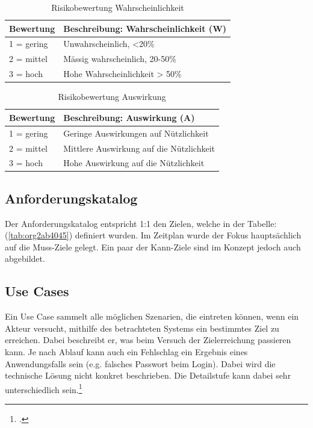 \begin{table}
\centering
\begin{tabular}{l|l}
\textbf{Bewertung} & \textbf{Beschreibung: Wahrscheinlichkeit (W)}\\
\hline
1 = gering & Unwahrscheinlich, <20\%\\
2 = mittel & Mässig wahrscheinlich, 20-50\%\\
3 = hoch & Hohe Wahrscheinlichkeit > 50\%\\
\end{tabular}
\caption{\label{tab:orgc24b878}
Risikobewertung Wahrscheinlichkeit}

\end{table}
\begin{table}
\centering
\begin{tabular}{l|l}
\textbf{Bewertung} & \textbf{Beschreibung: Auswirkung (A)}\\
\hline
1 = gering & Geringe Auswirkungen auf Nützlichkeit\\
2 = mittel & Mittlere Auswirkung auf die Nützlichkeit\\
3 = hoch & Hohe Auswirkung auf die Nützlichkeit\\
\end{tabular}
\caption{\label{tab:org8a27a35}
Risikobewertung Auswirkung}

\end{table}

\subsection{Anforderungskatalog}
\label{sec:org90be6e5}

Der Anforderungskatalog entspricht 1:1 den Zielen, welche in der
Tabelle:(\ref{tab:org2ab4045}) definiert wurden. Im Zeitplan wurde der Fokus
hauptsächlich auf die Muss-Ziele gelegt. Ein paar der Kann-Ziele sind im
Konzept jedoch auch abgebildet.

\subsection{Use Cases}
\label{sec:orgfd94eff}

Ein Use Case sammelt alle möglichen Szenarien, die eintreten können,
wenn ein Akteur versucht, mithilfe des betrachteten Systems ein
bestimmtes Ziel zu erreichen. Dabei beschreibt er, was beim Versuch der
Zielerreichung passieren kann. Je nach Ablauf kann auch ein Fehlschlag
ein Ergebnis eines Anwendungsfalls sein (e.g. falsches Passwort beim
Login). Dabei wird die technische Lösung nicht konkret beschrieben.
Die Detailstufe kann dabei sehr unterschiedlich sein.\footcite{usecase}

